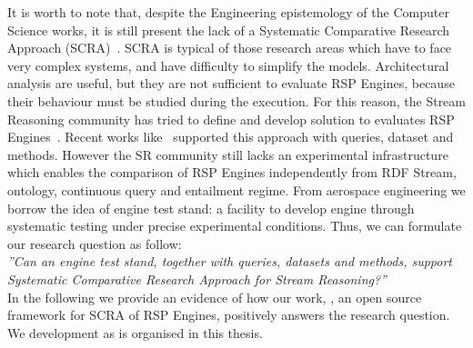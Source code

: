 It is worth to note that, despite the Engineering epistemology of the Computer Science works, it is still present the lack of a Systematic Comparative Research Approach (SCRA)~\cite{Tichy:1995:EEC:209090.209093}. SCRA is typical of those research areas which have to face very complex systems, and have difficulty to simplify the models. Architectural analysis are useful, but they are not sufficient to evaluate RSP Engines, because their behaviour must be studied during the execution. For this reason, the Stream Reasoning community has tried to define and develop solution to evaluates RSP Engines~\cite{DBLP:conf/esws/ScharrenbachUMVB13}. Recent works like~\cite{Zhang2012, LePhuoc2012c, DBLP:conf/semweb/DellAglioCBCV13} supported this approach with queries, dataset and methods. However the SR community still lacks an experimental infrastructure which enables the comparison of RSP Engines independently from RDF Stream, ontology, continuous query and entailment regime.  From aerospace engineering we borrow the idea of engine test stand: a facility to develop engine through systematic testing under precise experimental conditions. Thus, we can formulate our research question as follow:\\

\textit{”Can an engine test stand, together with queries, datasets and methods, support Systematic Comparative Research Approach for Stream Reasoning?”}\\


\noindent In the following we provide an evidence of how our work, \name, an open source framework for SCRA of RSP Engines, positively answers the research question. We development as is organised in this thesis.

